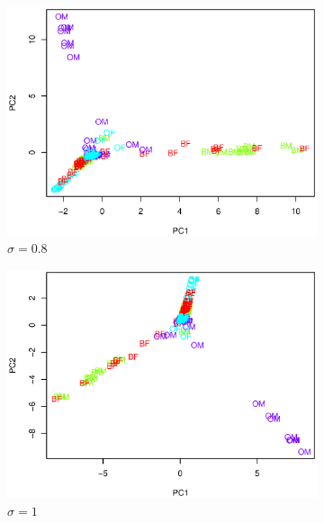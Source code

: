 \documentclass{article}
\begin{document}
\begin{enumerate}[leftmargin = 0 em, label = \arabic*., font = \bfseries]
\begin{enumerate}
\begin{figure}[!htb]
\begin{subfigure}[b]{0.45\textwidth}
	\includegraphics[width = \textwidth]{sigma08.eps}
	\caption{$\sigma = 0.8$}
	\end{subfigure}%
	\begin{subfigure}[b]{0.45\textwidth}
	\includegraphics[width = \textwidth]{sigma1.eps}
	\caption{$\sigma = 1$}
	\end{subfigure}%
	\\
	\begin{subfigure}[b]{0.45\textwidth}

\end{subfigure}
\end{figure}
\end{enumerate}
\end{enumerate}
\end{document}
